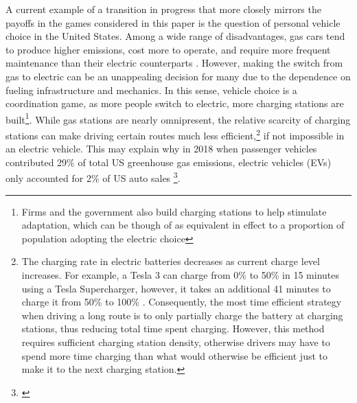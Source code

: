 A current example of a transition in progress that more closely mirrors the payoffs in the games considered in this paper is the question of personal vehicle choice in the United States. Among a wide range of disadvantages, gas cars tend to produce higher emissions, cost more to operate, and require more frequent maintenance than their electric counterparts \citep{malmgren2016quantifying, harto2020electric}. However, making the switch from gas to electric can be an unappealing decision for many due to the dependence on fueling infrastructure and mechanics. In this sense, vehicle choice is a coordination game, as more people switch to electric, more charging stations are built\footnote{Firms and the government also build charging stations to help stimulate adaptation, which can be though of as equivalent in effect to a proportion of population adopting the electric choice}. While gas stations are nearly omnipresent, the relative scarcity of charging stations can make driving certain routes much less efficient,\footnote{The charging rate in electric batteries decreases as current charge level increases. For example, a Tesla 3 can charge from 0\% to 50\% in 15 minutes using a Tesla Supercharger, however, it takes an additional 41 minutes to charge it from 50\% to 100\% \citep{chargingtime}. Consequently, the most time efficient strategy when driving a long route is to only partially charge the battery at charging stations, thus reducing total time spent charging. However, this method requires sufficient charging station density, otherwise drivers may have to spend more time charging than what would otherwise be efficient just to make it to the next charging station.} if not impossible in an electric vehicle. This may explain why in 2018 when passenger vehicles contributed 29\% of total US greenhouse gas emissions, electric vehicles (EVs) only accounted for 2\% of US auto sales \footnote{\cite{uaw_report}}.

